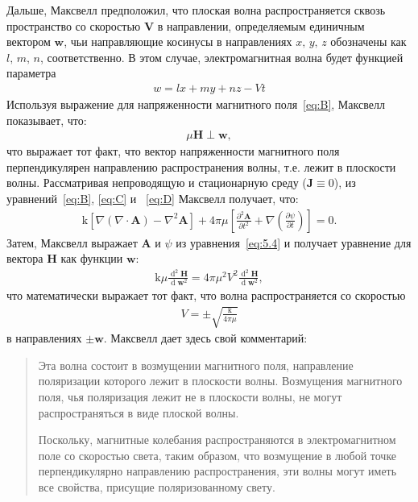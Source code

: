 \documentclass[12pt, oneside, a4paper]{article}
\begin{document}
Дальше, Максвелл предположил, что плоская волна распространяется сквозь пространство со скоростью $\mathbf{V}$ в направлении, определяемым единичным вектором $\mathbf{w}$, чьи направляющие косинусы в направлениях $x,\,y,\,z$ обозначены как $l,\,m,\,n$, соответственно. В этом случае, электромагнитная волна будет функцией параметра
\begin{align*}
w=lx+my+nz-Vt
\end{align*}
Используя выражение для напряженности магнитного поля~\eqref{eq:B}, Максвелл показывает, что:
\begin{align*}
\mu\mathbf{H}\perp\mathbf{w},
\end{align*}
что выражает тот факт, что вектор напряженности магнитного поля перпендикулярен направлению распространения волны, т.е. лежит в плоскости волны. Рассматривая непроводящую и стационарную среду ($\mathbf{J}\equiv0$), из уравнений~\eqref{eq:B}, \eqref{eq:C} и ~\eqref{eq:D} Максвелл получает, что:
\begin{align}
\mathrm{k}\left[\nabla\left(\nabla\cdot\mathbf{A}\right)-\nabla^2\mathbf{A}\right]+4\pi\mu\left[\frac{\partial^2\mathbf{A}}{\partial{}t^2}+\nabla\left(\frac{\partial\psi}{\partial{}t}\right)\right]=0.\label{eq:5.4}
\end{align}
Затем, Максвелл выражает $\mathbf{A}$ и $\psi$ из уравнения~\eqref{eq:5.4} и получает уравнение для вектора $\mathbf{H}$ как функции $\mathbf{w}$:
\begin{align*}
\mathrm{k}\mu\frac{\operatorname{d}^2\mathbf{H}}{\operatorname{d}\mathbf{w}^2}=4\pi\mu^2V^2\frac{\operatorname{d}^2\mathbf{H}}{\operatorname{d}\mathbf{w}^2},
\end{align*}
что математически выражает тот факт, что волна распространяется со скоростью\begin{align}
V=\pm\sqrt{\frac{\mathrm{k}}{4\pi\mu}}\label{eq:5.7}
\end{align} 
в направлениях $\pm\mathbf{w}$.
Максвелл дает здесь свой комментарий:
\begin{quotation}
\small
Эта волна состоит в возмущении магнитного поля, направление поляризации которого лежит в плоскости волны. Возмущения магнитного поля, чья поляризация лежит не в плоскости волны, не могут распространяться в виде плоской волны.

Поскольку, магнитные колебания распространяются в электромагнитном поле со скоростью света, таким образом, что возмущение в любой точке перпендикулярно направлению распространения, эти волны могут иметь все свойства, присущие поляризованному свету.
\end{quotation}
\end{document}
